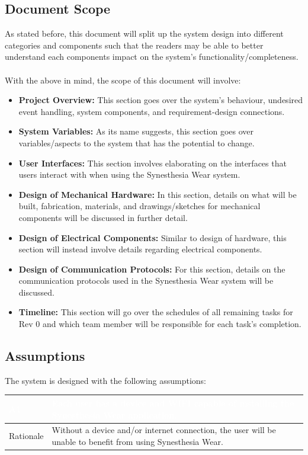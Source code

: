 \documentclass[12pt, titlepage]{article}
\begin{document}
\subsection {Document Scope}
As stated before, this document will split up the system design into different categories and components 
such that the readers may be able to better understand each components impact on the system's functionality/completeness.\\\\
\noindent With the above in mind, the scope of this document will involve:
\begin{itemize}
  \item \textbf{Project Overview:} This section goes over the system's behaviour, undesired event handling, system components, and requirement-design connections.  
  \item \textbf{System Variables:} As its name suggests, this section goes over variables/aspects to the system that has the potential to change.
  \item \textbf{User Interfaces:} This section involves elaborating on the interfaces that users interact with when using the Synesthesia Wear system.
  \item \textbf{Design of Mechanical Hardware:} In this section, details on what will be built, fabrication, materials, and drawings/sketches for mechanical components will be discussed in further detail. 
  \item \textbf{Design of Electrical Components:} Similar to design of hardware, this section will instead involve details regarding electrical components.
  \item \textbf{Design of Communication Protocols:} For this section, details on the communication protocols used in the Synesthesia Wear system will be discussed.
  \item \textbf{Timeline:} This section will go over the schedules of all remaining tasks for Rev 0 and which team member will be responsible for each task's completion.
\end{itemize}

\subsection {Assumptions}
The system is designed with the following assumptions:
\begin{table}[H]
  \centering
  \begin{tabular}{|p{3cm}|p{11cm}|} 
  \hline
  \rowcolor[rgb]{0.071,0.49,0.698} \textcolor{white}{A1} & \textcolor{white}{Each user has a device and WIFI capable of installing the Synesthesia Wear application.}                                          \\ 
  \hline
  \rowcolor[rgb]{0.675,0.827,0.902} Rationale               & Without a device and/or internet connection, the user will be unable to benefit from using Synesthesia Wear.\\
  \hline
  \end{tabular}
\end{table}
\end{document}
